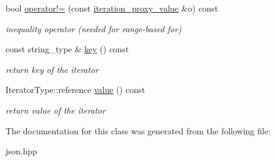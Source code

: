 \begin{DoxyCompactItemize}
\mbox{\label{classnlohmann_1_1detail_1_1iteration__proxy__value_a646dbb2b1842f44f42ee1e14245b8595}} 
bool \mbox{\hyperlink{classnlohmann_1_1detail_1_1iteration__proxy__value_a646dbb2b1842f44f42ee1e14245b8595}{operator!=}} (const \mbox{\hyperlink{classnlohmann_1_1detail_1_1iteration__proxy__value}{iteration\+\_\+proxy\+\_\+value}} \&o) const
\begin{DoxyCompactList}\small\item\em inequality operator (needed for range-\/based for) \end{DoxyCompactList}\item 
\mbox{\label{classnlohmann_1_1detail_1_1iteration__proxy__value_af2949ac0d70212738030bfda29c5bcc2}} 
const string\+\_\+type \& \mbox{\hyperlink{classnlohmann_1_1detail_1_1iteration__proxy__value_af2949ac0d70212738030bfda29c5bcc2}{key}} () const
\begin{DoxyCompactList}\small\item\em return key of the iterator \end{DoxyCompactList}\item 
\mbox{\label{classnlohmann_1_1detail_1_1iteration__proxy__value_ab8e33bd01c285a1a80b737a1905ceb97}} 
Iterator\+Type\+::reference \mbox{\hyperlink{classnlohmann_1_1detail_1_1iteration__proxy__value_ab8e33bd01c285a1a80b737a1905ceb97}{value}} () const
\begin{DoxyCompactList}\small\item\em return value of the iterator \end{DoxyCompactList}\end{DoxyCompactItemize}


The documentation for this class was generated from the following file\+:\begin{DoxyCompactItemize}
\item 
json.\+hpp\end{DoxyCompactItemize}
